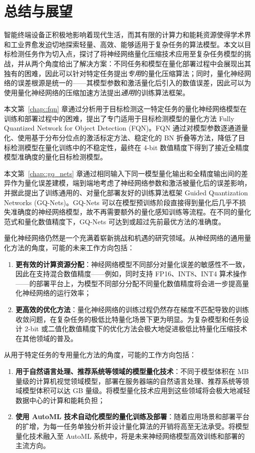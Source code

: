 \chapter{总结与展望}
智能终端设备正积极地影响着现代生活，而其有限的计算力和能耗资源使得学术界和工业界愈发迫切地探索轻量、高效、能够适用于复杂任务的算法模型。本文以目标检测任务作为切入点，探讨了将神经网络量化压缩技术应用至复杂任务模型的挑战，并从两个角度给出了解决方案：不同任务和模型在量化部署过程中会展现出其独有的困难，因此可以针对特定任务提出\emph{专用}的量化压缩算法；同时，量化神经网络的误差根源是统一的——其模型参数和激活量化后引入的数值误差，因此可以为使用量化神经网络的压缩加速方法提出\emph{通用}的训练算法框架。

本文第~\ref{chap::fqn} 章通过分析用于目标检测这一特定任务的量化神经网络模型在训练和部署过程中的困难，提出了专门适用于目标检测模型的量化方法 Fully Quantized Network for Object Detection (FQN)。FQN 通过对模型参数逐通道量化、使用基于分布分位点的激活标定方法、稳定化的 BN 折叠等方法，降低了目标检测模型在量化训练中的不稳定性，最终在 4-bit 数值精度下得到了接近全精度模型准确度的量化目标检测模型。

本文第~\ref{chap::gq_nets} 章通过相同输入下同一模型量化输出和全精度输出间的差异作为量化误差建模，端到端地考虑了神经网络参数和激活被量化后的误差影响，并据此提出了训练通用的、对量化部署友好的训练算法框架 Guided Quantization Networks (GQ-Nets)。GQ-Nets 可以在模型预训练阶段直接得到量化后几乎不损失准确度的神经网络模型，故不再需要额外的量化感知训练等流程。在不同的量化范式和量化数值精度下，GQ-Nets 可达到或超过先前最优方法的准确度。

量化神经网络仍然是一个充满着崭新挑战和机遇的研究领域。从神经网络的通用量化方法的角度，可能的未来工作方向包括：
\begin{enumerate}
  \item \textbf{更有效的计算资源分配}：神经网络模型不同部分对量化误差的敏感性不一致，因此在支持混合数值精度——例如，同时支持 FP16、INT8、INT4 算术操作——的部署平台上，为模型不同部分分配不同量化数值精度将会进一步提高量化神经网络的运行效率；
  \item \textbf{更高效的优化方法}：量化神经网络的训练过程仍然存在梯度不匹配导致的训练收敛问题，在复杂任务的极低比特量化场景下更为明显。为复杂模型和任务设计 2-bit 或二值化数值精度下的优化方法会极大地促进极低比特量化压缩技术在其他领域的普及。
\end{enumerate}

从用于特定任务的专用量化方法的角度，可能的工作方向包括：
\begin{enumerate}
  \item \textbf{用于自然语言处理、推荐系统等领域的模型量化技术}：不同于模型体积在 MB 量级的计算机视觉领域模型，部署在服务器端的自然语言处理、推荐系统等领域模型体积可以达 GB 量级。将模型量化技术应用到这些领域将会极大地减轻数据中心的计算和能耗负担；
  \item \textbf{使用 AutoML 技术自动化模型的量化训练及部署}：随着应用场景和部署平台的扩增，为每一任务单独分析并设计量化算法的开销将高至无法承受。将模型量化技术融入至 AutoML 系统中，将是未来神经网络模型高效训练和部署的主流方向。
\end{enumerate}
